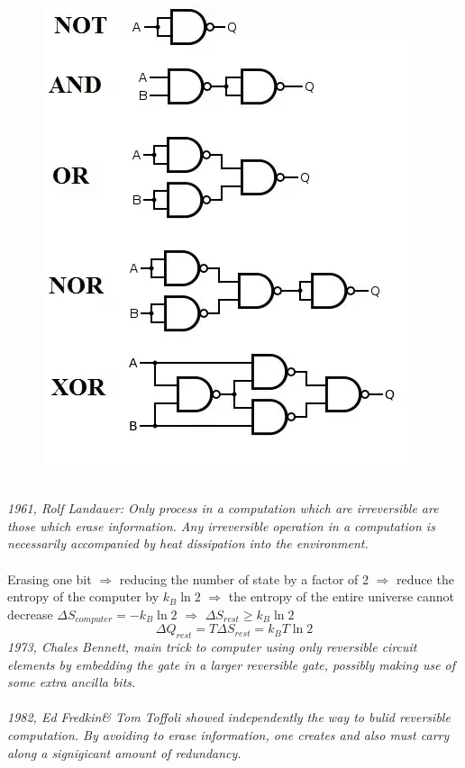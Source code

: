 \documentclass[]{article}
\theoremstyle{nonumberplain}
\begin{document}
\begin{figure}[h]
\centering
	\includegraphics[scale = 0.5]{graph/11.png}
\end{figure}
\newpage
\ \\
\textit{1961, Rolf Landauer: Only process in a computation which are irreversible are those which erase information. Any irreversible operation in a computation is necessarily accompanied by heat dissipation into the environment.} \\
\\
Erasing one bit $\Rightarrow$ reducing the number of state by a factor of 2 $\Rightarrow$ reduce the entropy of the computer by $k_{B}\ln{2}$ $\Rightarrow$ the entropy of the entire universe cannot decrease $\Delta S_{computer}=-k_{B}\ln{2}$ $\Rightarrow$ $\Delta S_{rest}\geq k_{B}\ln{2}$
\[
	\Delta Q_{rest}=T\Delta S_{rest} = k_{B}T\ln{2}
\] 
\textit{1973, Chales Bennett, main trick to computer using only reversible circuit elements by embedding the gate in a larger reversible gate, possibly making use of some extra ancilla bits.} \\
\\
\textit{1982, Ed Fredkin\& Tom Toffoli showed independently the way to bulid reversible computation. By avoiding to erase information, one creates and also must carry along a signigicant amount of redundancy.} \\
\end{document}
